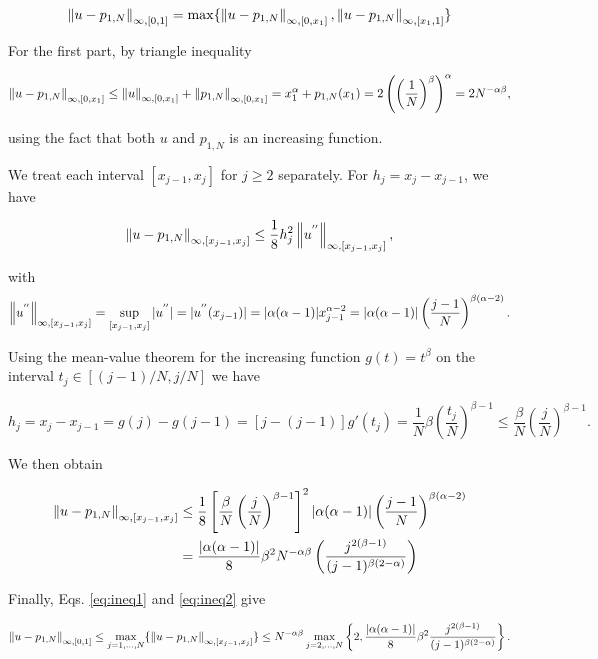 \documentclass[a4paper,11pt]{article}
\begin{document}
{$$\left\|u - p_{1,N}\right\|_{\infty,[0,1]} = \max \{ \left\|u - p_{1,N}\right\|_{\infty,[0,x_{1}]}, \left\|u - p_{1,N}\right\|_{\infty,[x_{1},1]}\}$$

For the first part, by triangle inequality

\begin{equation}
\label{eq:ineq1}
\left\|u - p_{1,N}\right\|_{\infty,[0,x_{1}]} \leq \left\|u\right\|_{\infty,[0,x_{1}]} + \left\|p_{1,N}\right\|_{\infty,[0,x_{1}]} = x_{1}^{\alpha} + p_{1,N}(x_{1}) = 2\left( \left(\frac{1}{N}\right)^{\beta}\right)^{\alpha} = 2N^{- \alpha \beta },  
\end{equation}

using the fact that both $u$ and $p_{1,N}$ is an increasing function.

We treat each interval $[x_{j-1},x_{j}]$ for $j \geq 2$ separately. For $h_{j} = x_{j} - x_{j-1}$, we have

$$\left\|u - p_{1,N}\right\|_{\infty,[x_{j-1},x_{j}]} \leq \frac{1}{8} h_{j}^{2} \left\|u^{''}\right\|_{\infty,[x_{j-1},x_{j}]}, $$


with $$ \left\|u^{''}\right\|_{\infty,[x_{j-1},x_{j}]} = \sup_{[x_{j-1},x_{j}]} |u^{''}| = |u^{''}(x_{j-1})| = |\alpha(\alpha - 1)|x_{j-1}^{\alpha -2} = |\alpha(\alpha - 1)| \left(\frac{j-1}{N}  \right)^{\beta(\alpha -2)}.$$

Using the mean-value theorem for the increasing function $g(t) = t^{\beta}$ on the interval $t_{j} \in [(j-1)/N,j/N]$ we have

$$ h_{j} = x_{j} - x_{j-1} = g(j) - g(j-1) = [j - (j-1)]g'(t_{j}) = \frac{1}{N} \beta \left(\frac{t_{j}}{N}\right)^{\beta - 1} \leq \frac{\beta}{N} \left(\frac{j}{N}\right)^{\beta - 1}.$$

We then obtain 

\begin{equation}
\label{eq:ineq2}
\begin{split}
  \left\|u - p_{1,N}\right\|_{\infty,[x_{j-1},x_{j}]} &\leq \frac{1}{8} \left[ \frac{\beta}{N} \left(\frac{j}{N}\right)^{\beta - 1} \right]^{2} |\alpha(\alpha - 1)| \left(\frac{j-1}{N}  \right)^{\beta(\alpha -2)}\\
  &=\frac{|\alpha(\alpha - 1)|}{8} \beta^{2} N^{-\alpha \beta} \left( \frac{j^{2(\beta - 1)}}{(j-1)^{\beta(2-\alpha)}}\right)
\end{split}
\end{equation}

Finally, Eqs. \eqref{eq:ineq1} and  \eqref{eq:ineq2} give

$$\left\|u - p_{1,N}\right\|_{\infty,[0,1]} \leq \max_{j=1,\dots,N} \{ \left\|u - p_{1,N}\right\|_{\infty,[x_{j-1},x_{j}]}\} \leq N^{-\alpha \beta} \max_{j=2,\dots,N} \left\{2, \frac{|\alpha(\alpha - 1)|}{8} \beta^{2} \frac{j^{2(\beta - 1)}}{(j-1)^{\beta(2-\alpha)}}\right\}.$$

}
\end{document}
